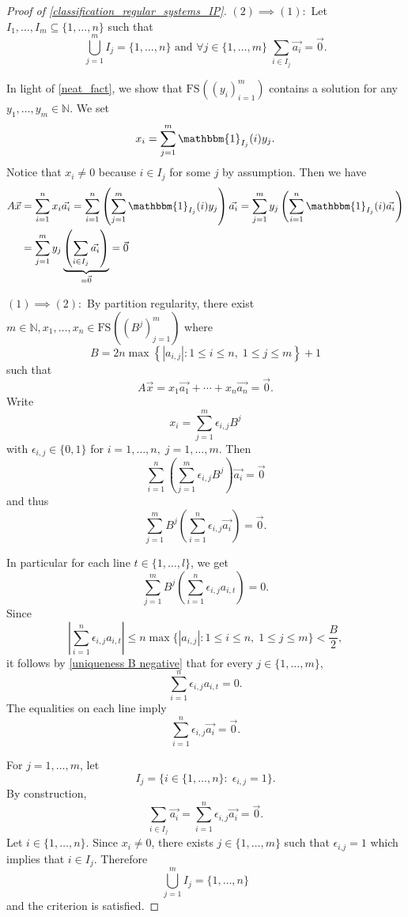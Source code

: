 \documentclass[10pt,a4paper]{amsart}
\newcommand{\FS}[2][]{\ensuremath{\mathrm{FS}^{#1}\left(#2\right)}}
\newcommand{\N}{\ensuremath{\mathbb{N}}}
\newcommand{\abs}[1]{\left | #1 \right |}
\newcommand{\ind}{\ensuremath{ \mathbbm{1}}}
\begin{document}
\begin{proof}[Proof of \cref{classification_regular_systems_IP}]
    $(2) \implies (1):$ Let $I_1,\ldots, I_m \subseteq \{1,\ldots,n\}$ such that 
        $$\bigcup_{j=1}^m I_j = \{1,\ldots,n\} \text{ and } \forall j \in \{1,\ldots,m\} \; \sum_{i \in I_j} \Vec{a_i} = \Vec{0}.$$

        In light of \cref{neat_fact}, we show that $\FS{(y_i)_{i=1}^m}$ contains a solution for any $y_1,\ldots,y_m \in \N$. We set 
        $$x_i = \sum_{j=1}^m \ind_{I_j}(i) y_j.$$
        Notice that $x_i \neq 0$ because $i\in I_j$ for some $j$ by assumption. Then we have
    \begin{align*}
        A\Vec{x} &= \sum_{i=1}^n x_i \Vec{a_i}
            = \sum_{i=1}^n \left (\sum_{j=1}^m \ind_{I_j}(i) y_j \right) \Vec{a_i}
            = \sum_{j=1}^m y_j \left(\sum_{i=1}^n \ind_{I_j}(i) \Vec{a_i}\right)\\
            &= \sum_{j=1}^m y_j\underbrace{\left (\sum_{i\in I_j} \Vec{a_i} \right )}_{=\Vec{0}}
            =\Vec{0}
    \end{align*}

    
    $(1) \implies (2):$ By partition regularity, there exist $m \in \N, x_1, \ldots, x_n \in \FS{(B^j)_{j=1}^m}$ where
    $$B= 2n  \max\left\{\abs{a_{i,j}}: 1 \leq i\leq n, \; 1 \leq j \leq m \right\} + 1$$
    such that
    $$A\Vec{x}= x_1 \Vec{a_1} + \cdots + x_n \Vec{a_n} =\Vec{0}.$$
    Write $$x_i= \sum_{j=1}^m \epsilon_{i,j} B^j$$ with $\epsilon_{i,j} \in \{0,1\}$ for $i=1,\ldots,n,\; j= 1,\ldots,m$. Then
    $$\sum_{i=1}^n \left( \sum_{j=1}^m \epsilon_{i,j} B^j\right) \Vec{a_i} = \Vec{0}$$
    and thus
    $$\sum_{j=1}^m B^j\left (\sum_{i=1}^n \epsilon_{i,j} \Vec{a_i} \right )= \Vec{0}.$$
    
    In particular for each line $ t \in \{1,\ldots,l\}$, we get
    $$\sum_{j=1}^m B^j\left (\sum_{i=1}^n \epsilon_{i,j} a_{i,t} \right )= 0.$$
    Since $$\abs{\sum_{i=1}^n   \epsilon_{i,j} a_{i,t}} \leq n \max\{\abs{a_{i,j}}: 1 \leq i\leq n, \; 1 \leq j \leq m\} < \frac{B}{2},$$
    it follows by \cref{uniqueness B negative} that for every $j\in \{1,\ldots,m\}$,
    $$\sum_{i=1}^n \epsilon_{i,j} a_{i,t} = 0.$$
    The equalities on each line imply
    $$\sum_{i=1}^n \epsilon_{i,j} \Vec{a_i}= \Vec{0}.$$
    
    For $j=1,\ldots,m$, let $$I_j = \{i \in \{1,\ldots,n\}: \; \epsilon_{i,j}= 1\}.$$ By construction,
    $$\sum_{i\in I_j} \Vec{a_i} = \sum_{i=1}^n  \epsilon_{i,j} \Vec{a_i} = \Vec{0}.$$
    Let $i \in \{1,\ldots,n\}$. Since $x_i \neq 0$, there exists $j\in \{1,\ldots,m\}$ such that $\epsilon_{i.j}= 1$ which implies that $i \in I_j$. Therefore $$\bigcup_{j=1}^m I_j = \{1,\ldots,n\}$$ and the criterion is satisfied.    
\end{proof}
\end{document}

